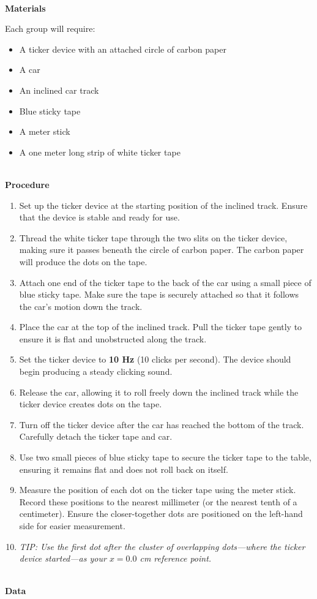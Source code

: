 \begin{questions}
\textbf{\\\Large Materials\\}

Each group will require:
\begin{itemize} 
    \item A ticker device with an attached circle of carbon paper 
    \item A car
    \item An inclined car track 
    \item Blue sticky tape 
    \item A meter stick
    \item A one meter long strip of white ticker tape
\end{itemize}

\textbf{\\\Large Procedure\\}

\begin{enumerate}
    \item Set up the ticker device at the starting position of the inclined track. Ensure that the device is stable and ready for use.
    \item Thread the white ticker tape through the two slits on the ticker device, making sure it passes beneath the circle of carbon paper. The carbon paper will produce the dots on the tape.
    \item Attach one end of the ticker tape to the back of the car using a small piece of blue sticky tape. Make sure the tape is securely attached so that it follows the car's motion down the track.
    \item Place the car at the top of the inclined track. Pull the ticker tape gently to ensure it is flat and unobstructed along the track.
    \item Set the ticker device to \textbf{10 Hz} (10 clicks per second). The device should begin producing a steady clicking sound.
    \item Release the car, allowing it to roll freely down the inclined track while the ticker device creates dots on the tape.
    \item Turn off the ticker device after the car has reached the bottom of the track. Carefully detach the ticker tape and car.
    \item Use two small pieces of blue sticky tape to secure the ticker tape to the table, ensuring it remains flat and does not roll back on itself.
    \item Measure the position of each dot on the ticker tape using the meter stick. Record these positions to the nearest millimeter (or the nearest tenth of a centimeter). Ensure the closer-together dots are positioned on the left-hand side for easier measurement.
    \item \textit{TIP: Use the first dot after the cluster of overlapping dots---where the ticker device started---as your $x = 0.0$ cm reference point.}
\end{enumerate}
\newpage
\textbf{\\\Large Data\\}


\end{questions}
